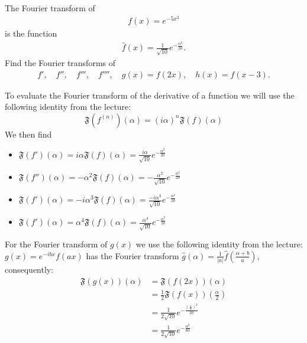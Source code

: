 \documentclass[11pt]{article}
\begin{document}

\begin{exercise}
    The Fourier transform of 
    \begin{align*}
        f(x) = e^{-5x^2}
    \end{align*}
    is the function 
    \begin{align*}
        \hat f(x) = \frac{1}{\sqrt{10}} e^{-\frac{\alpha^2}{20}}.
    \end{align*}
    Find the Fourier transforms of 
    \begin{align*}
     f', \quad f'', \quad f''', \quad f'''', \quad g(x) = f(2x), \quad h(x) = f(x-3).
    \end{align*}
\end{exercise}
\begin{solution}  
    To evaluate the Fourier transform of the derivative of a function we will use the following identity from the lecture:
    \[
        \mathfrak{F}\left(f^{(n)}\right)(\alpha)=(i \alpha)^n \mathfrak{F}(f)(\alpha)
    \]
    We then find 
    \begin{itemize}
    \item $\mathfrak{F}\left(f' \right)(\alpha) = i \alpha \mathfrak{F}(f)(\alpha) = \frac{i \alpha}{\sqrt{10}} e^{-\frac{\alpha^2}{20}}$
    \item $\mathfrak{F}\left(f'' \right)(\alpha) = -\alpha^2 \mathfrak{F}(f)(\alpha) = -\frac{ \alpha^2}{\sqrt{10}} e^{-\frac{\alpha^2}{20}}$
    \item $\mathfrak{F}\left(f' \right)(\alpha) = -i \alpha^3 \mathfrak{F}(f)(\alpha) = \frac{-i \alpha^3}{\sqrt{10}} e^{-\frac{\alpha^2}{20}}$
    \item $\mathfrak{F}\left(f' \right)(\alpha) = \alpha^4 \mathfrak{F}(f)(\alpha) = \frac{ \alpha^4}{\sqrt{10}} e^{-\frac{\alpha^2}{20}}$
    \end{itemize}
    For the Fourier transform of $g(x)$ we use the following identity from the lecture: 
    $g(x)=e^{-i b x} f(a x)$ has the Fourier transform
    $\hat{g}(\alpha)=\frac{1}{|a|} \hat{f}\left(\frac{\alpha+b}{a}\right)$,
    consequently:
    \begin{align*}
        \mathfrak{F}(g(x))(\alpha) & =\mathfrak{F}(f(2 x))(\alpha) \\ & =\frac{1}{2} \mathfrak{F}(f(x))\left(\frac{\alpha}{2}\right) \\ & =\frac{1}{2 \sqrt{10}} e^{-\frac{\left(\frac{\alpha}{2}\right)^2}{20}} \\ & =\frac{1}{2 \sqrt{10}} e^{-\frac{\alpha^2}{80}}

\end{align*}
\end{solution}
\end{document}
